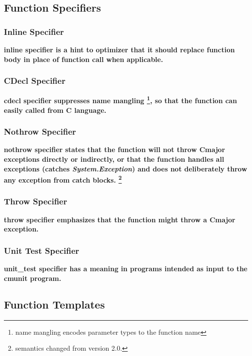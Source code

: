 \documentclass[a4paper,oneside,11pt]{article}
\begin{document}
\subsection{Function Specifiers}

\subsubsection{Inline Specifier}

\bf{inline} specifier is a hint to optimizer that
it should replace function body in place of function call when applicable.

\subsubsection{CDecl Specifier}

\bf{cdecl} specifier suppresses name mangling \footnote{name mangling encodes parameter types to the function name},
so that the function can easily called from C language.

\subsubsection{Nothrow Specifier}

\bf{nothrow} specifier states that the function will not throw Cmajor exceptions directly or indirectly,
or that the function handles all exceptions (catches \emph{System.Exception})
and does not deliberately throw any exception from catch blocks. \footnote{semantics changed from version 2.0.}

\subsubsection{Throw Specifier}

\bf{throw} specifier emphasizes that the function might throw a Cmajor exception.

\subsubsection{Unit Test Specifier}

\bf{unit\_test} specifier has a meaning in programs intended as input to the \bf{cmunit} program.

\subsection{Function Templates}
\end{document}
